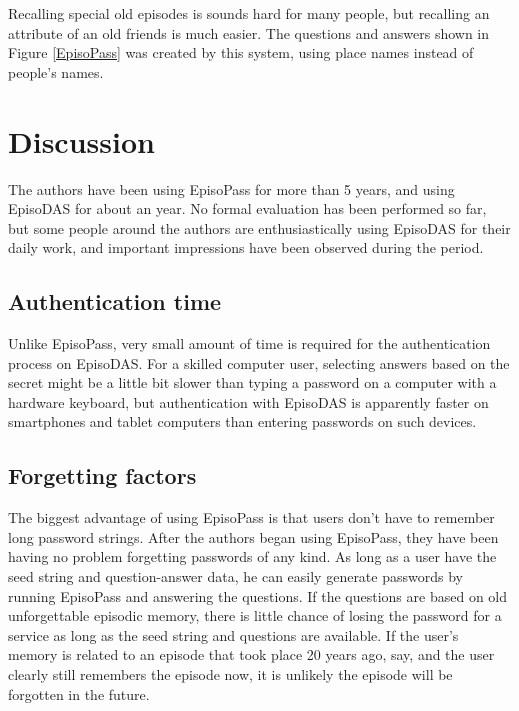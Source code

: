 \documentclass[sigconf]{acmart}
\begin{document}
Recalling special old episodes is sounds hard for many people, but
recalling an attribute of an old friends is much easier.
The questions and answers shown in Figure \ref{EpisoPass} was
created by this system,
using place names instead of people's names.

\section{Discussion}

The authors have been using EpisoPass for more than 5 years, and
using EpisoDAS for about an year.
No formal evaluation has been performed so far, but
some people around the authors are enthusiastically using
EpisoDAS for their daily work, and
important impressions have been observed during the period.

\subsection{Authentication time}

Unlike EpisoPass,
very small amount of time is required for
the authentication process on EpisoDAS.
For a skilled computer user,
selecting answers based on the secret might be a little bit slower than
typing a password on a computer with a hardware keyboard, but
authentication with
EpisoDAS is apparently faster on smartphones and tablet computers
than entering passwords on such devices.

\subsection{Forgetting factors}

The biggest advantage of using EpisoPass is that users don't have to
remember long password strings.
%
After the authors began using EpisoPass,
they have been having no problem forgetting passwords of any kind.
%
As long as a user have the seed string and question-answer data,
he can easily generate passwords by running
EpisoPass and answering the questions.
%
If the questions are based on old unforgettable episodic memory,
there is little chance of losing the password for a service
as long as the seed string and questions are available.
%
If the user's memory is related to an episode that took place 20 years
ago, say, and the user clearly still remembers the episode now, it is
unlikely the episode will be forgotten in the future.

\end{document}
